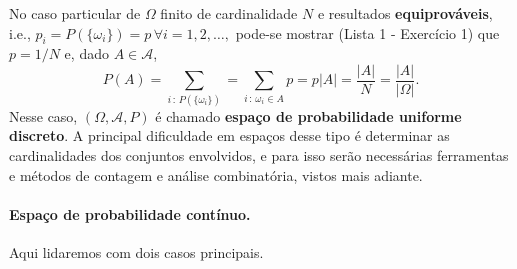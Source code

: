 \documentclass[../Notas.tex]{subfiles}
\begin{document}
No caso particular de $\Omega$ finito de cardinalidade $N$ e resultados {\bf equiprováveis}, i.e., $p_i = P(\{ \omega_i \}) = p \, \forall i = 1,2,\dots,$ pode-se mostrar (Lista 1 - Exercício 1) que $p = 1/N$ e, dado $A\in\mathcal{A}$, 
$$
P(A) = \sum_{i \, : \, P(\{ \omega_i \})} = \sum_{i \, : \, \omega_i\in A}p = p|A| = \frac{|A|}{N} = \frac{|A|}{|\Omega|}.
$$
Nesse caso, $(\Omega, \mathcal{A}, P)$ é chamado {\bf espaço de probabilidade uniforme discreto}. A principal dificuldade em espaços desse tipo é determinar as cardinalidades dos conjuntos envolvidos, e para isso serão necessárias ferramentas e métodos de contagem e análise combinatória, vistos mais adiante.

\paragraph{Espaço de probabilidade contínuo.} Aqui lidaremos com dois casos principais.
\end{document}
